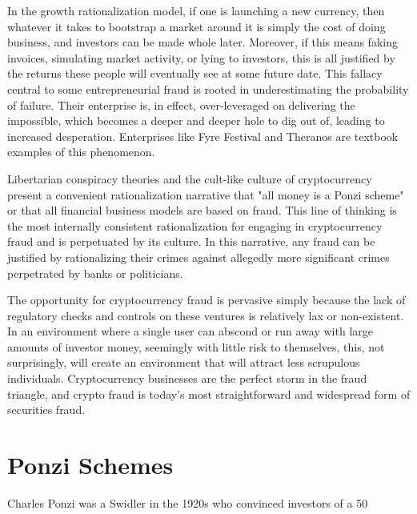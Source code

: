 In the growth rationalization model, if one is launching a new currency, then
whatever it takes to bootstrap a market around it is simply the cost of doing
business, and investors can be made whole later. Moreover, if this means faking
invoices, simulating market activity, or lying to investors, this is all
justified by the returns these people will eventually see at some future date.
This fallacy central to some entrepreneurial fraud is rooted in underestimating
the probability of failure. Their enterprise is, in effect, over-leveraged on
delivering the impossible, which becomes a deeper and deeper hole to dig out of,
leading to increased desperation. Enterprises like Fyre Festival and Theranos
are textbook examples of this phenomenon.


Libertarian conspiracy theories and the cult-like culture of cryptocurrency
present a convenient rationalization narrative that "all money is a Ponzi
scheme" or that all financial business models are based on fraud. This line of
thinking is the most internally consistent rationalization for engaging in
cryptocurrency fraud and is perpetuated by its culture. In this narrative, any
fraud can be justified by rationalizing their crimes against allegedly more
significant crimes perpetrated by banks or politicians.

The opportunity for cryptocurrency fraud is pervasive simply because the lack of
regulatory checks and controls on these ventures is relatively lax or
non-existent. In an environment where a single user can abscond or run away with
large amounts of investor money, seemingly with little risk to themselves, this,
not surprisingly, will create an environment that will attract less scrupulous
individuals. Cryptocurrency businesses are the perfect storm in the fraud
triangle, and crypto fraud is today's most straightforward and widespread form
of securities fraud.

\section{Ponzi Schemes}

Charles Ponzi was a Swidler in the 1920s who convinced investors of a 50%

